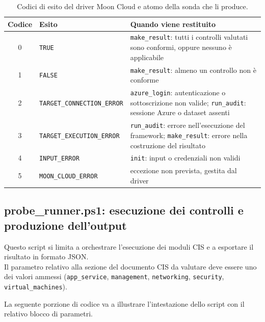 \documentclass[a4paper,11pt]{report}
\begin{document}
\begin{table}[H]
\centering
\begin{tabular}{|c|l|p{7cm}|}
\hline
\textbf{Codice} & \textbf{Esito} & \textbf{Quando viene restituito} \\ \hline
0 & \texttt{TRUE} & \texttt{make\_result}: tutti i controlli valutati sono conformi, oppure nessuno è applicabile \\ \hline
1 & \texttt{FALSE} & \texttt{make\_result}: almeno un controllo non è conforme \\ \hline
2 & \texttt{TARGET\_CONNECTION\_ERROR} & \texttt{azure\_login}: autenticazione o sottoscrizione non valide; \texttt{run\_audit}: sessione Azure o dataset assenti \\ \hline
3 & \texttt{TARGET\_EXECUTION\_ERROR} & \texttt{run\_audit}: errore nell'esecuzione del framework; \texttt{make\_result}: errore nella costruzione del risultato \\ \hline
4 & \texttt{INPUT\_ERROR} & \texttt{init}: input o credenziali non validi \\ \hline
5 & \texttt{MOON\_CLOUD\_ERROR} & eccezione non prevista, gestita dal driver \\ \hline
\end{tabular}
\caption{Codici di esito del driver Moon Cloud e atomo della sonda che li produce.}
\label{tab:esiti}
\end{table}


\subsection{probe\_runner.ps1: esecuzione dei controlli e produzione dell'output}

Questo script si limita a orchestrare l'esecuzione dei moduli CIS e a esportare il risultato in formato JSON.\\
Il parametro relativo alla sezione del documento CIS da valutare deve essere uno dei valori ammessi (\texttt{app\_service}, \texttt{management}, \texttt{networking}, \texttt{security}, \texttt{virtual\_machines}).

La seguente porzione di codice va a illustrare l'intestazione dello script con il relativo blocco di parametri.
\end{document}
